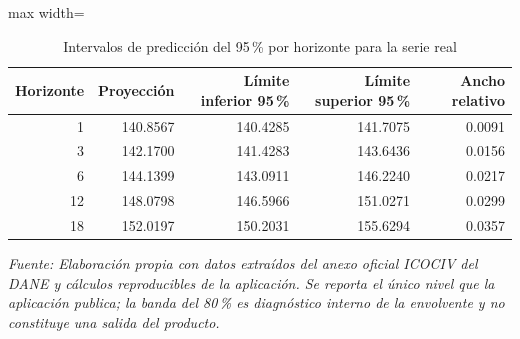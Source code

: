 \begin{table}[H]
\centering
\caption{Intervalos de predicción del 95\,\% por horizonte para la serie real}
\label{tab:ejemplo_intervalos_vias_urbanas}
\scriptsize
\begin{adjustbox}{max width=\linewidth}
\begin{tabular}{rrrrr}
\toprule
Horizonte & Proyección & Límite inferior 95\,\% & Límite superior 95\,\% & Ancho relativo \\
\midrule
1 & 140.8567 & 140.4285 & 141.7075 & 0.0091 \\
3 & 142.1700 & 141.4283 & 143.6436 & 0.0156 \\
6 & 144.1399 & 143.0911 & 146.2240 & 0.0217 \\
12 & 148.0798 & 146.5966 & 151.0271 & 0.0299 \\
18 & 152.0197 & 150.2031 & 155.6294 & 0.0357 \\
\bottomrule
\end{tabular}
\end{adjustbox}
\par\footnotesize\textit{Fuente: Elaboración propia con datos extraídos del anexo oficial ICOCIV del DANE y cálculos reproducibles de la aplicación. Se reporta el único nivel que la aplicación publica; la banda del 80\,\% es diagnóstico interno de la envolvente y no constituye una salida del producto.}
\end{table}
